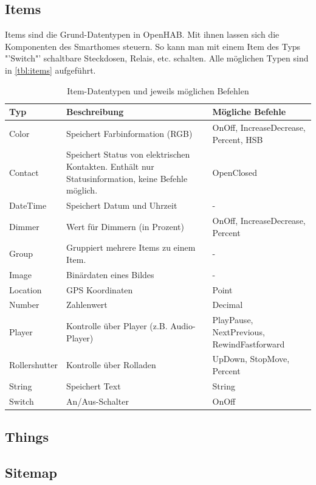 \subsection{Items}
Items sind die Grund-Datentypen in OpenHAB. Mit ihnen lassen sich die Komponenten des Smarthomes steuern. So kann man mit einem Item des Typs "'Switch"' schaltbare Steckdosen, Relais, etc. schalten. Alle möglichen Typen sind in \autoref{tbl:items} aufgeführt.

\begin{table}[H]
	\centering
	\setlength\extrarowheight{2pt}
	\begin{tabularx}{\textwidth}{LXX}  
		\toprule
		\textbf{Typ} & \textbf{Beschreibung} & \textbf{Mögliche Befehle}\\
		\midrule
		Color 	&  Speichert Farbinformation (RGB) &   OnOff, IncreaseDecrease, Percent, HSB 	\\
		Contact	&  Speichert Status von elektrischen Kontakten. Enthält nur Statusinformation, keine Befehle möglich. &	OpenClosed    \\
		DateTime   &	Speichert Datum und Uhrzeit & - \\
		Dimmer   & Wert für Dimmern (in Prozent) & OnOff, IncreaseDecrease, Percent\\
		Group   & Gruppiert mehrere Items zu einem Item. & -\\
		Image   & Binärdaten eines Bildes & -\\
		Location   & GPS Koordinaten & Point\\
		Number   & Zahlenwert & Decimal\\
		Player  & Kontrolle über Player (z.B. Audio-Player) & PlayPause, NextPrevious, RewindFastforward\\
		Rollershutter & Kontrolle über Rolladen& UpDown, StopMove, Percent\\
		String & Speichert Text & String \\
		Switch & An/Aus-Schalter& OnOff\\
		\bottomrule 
	\end{tabularx}
	\caption{Item-Datentypen und jeweils möglichen Befehlen}
	\label{tbl:items}
\end{table}

\subsection{Things}
\subsection{Sitemap}

